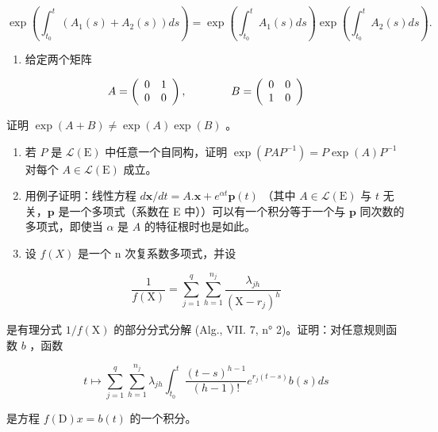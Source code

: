 \[
\exp \left(\int_ {t _ {0}} ^ {t} \left(A _ {1} (s) + A _ {2} (s)\right) d s\right) = \exp \left(\int_ {t _ {0}} ^ {t} A _ {1} (s) d s\right) \exp \left(\int_ {t _ {0}} ^ {t} A _ {2} (s) d s\right).
\]

\begin{enumerate}
\def\labelenumi{\arabic{enumi})}
\setcounter{enumi}{2}
\tightlist
\item
  给定两个矩阵
\end{enumerate}

\[
A = \left( \begin{array}{c c} 0 & 1 \\ 0 & 0 \end{array} \right), \qquad \qquad B = \left( \begin{array}{c c} 0 & 0 \\ 1 & 0 \end{array} \right)
\]

证明 \(\exp(A+B)\neq\exp(A)\exp(B)\) 。

\begin{enumerate}
\def\labelenumi{\arabic{enumi})}
\setcounter{enumi}{3}
\item
  若 \(P\) 是 \(\mathcal{L}(\mathrm{E})\) 中任意一个自同构，证明 \(\exp(PAP^{-1}) = P\exp(A)P^{-1}\) 对每个 \(A \in \mathcal{L}(\mathrm{E})\) 成立。
\item
  用例子证明：线性方程 \(d\mathbf{x} / dt = A.\mathbf{x} + e^{\alpha t}\mathbf{p}(t)\) （其中 \(A \in \mathcal{L}(\mathrm{E})\) 与 \(t\) 无关，\(\mathbf{p}\) 是一个多项式（系数在 E 中））可以有一个积分等于一个与 \(\mathbf{p}\) 同次数的多项式，即使当 \(\alpha\) 是 \(A\) 的特征根时也是如此。
\item
  设 \(f(X)\) 是一个 n 次复系数多项式，并设
\end{enumerate}

\[
\frac {1}{f (\mathrm{X})} = \sum_ {j = 1} ^ {q} \sum_ {h = 1} ^ {n _ {j}} \frac {\lambda_ {j h}}{(\mathrm{X} - r _ {j}) ^ {h}}
\]

是有理分式 \(1 / f(\mathrm{X})\) 的部分分式分解 (Alg., VII. 7, n° 2)。证明：对任意规则函数 \(b\) ，函数

\[
t \mapsto \sum_ {j = 1} ^ {q} \sum_ {h = 1} ^ {n _ {j}} \lambda_ {j h} \int_ {t _ {0}} ^ {t} \frac {(t - s) ^ {h - 1}}{(h - 1) !} e ^ {r _ {j} (t - s)} b (s) d s
\]

是方程 \(f(\mathrm{D})x = b(t)\) 的一个积分。

